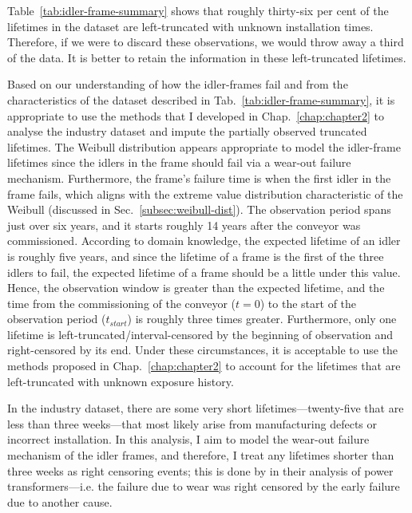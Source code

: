 Table~\ref{tab:idler-frame-summary} shows that roughly thirty-six per cent of the lifetimes in the dataset are left-truncated with unknown installation times. Therefore, if we were to discard these observations, we would throw away a third of the data. It is better to retain the information in these left-truncated lifetimes.

Based on our understanding of how the idler-frames fail and from the characteristics of the dataset described in Tab.~\ref{tab:idler-frame-summary}, it is appropriate to use the methods that I developed in Chap.~\ref{chap:chapter2} to analyse the industry dataset and impute the partially observed truncated lifetimes. The Weibull distribution appears appropriate to model the idler-frame lifetimes since the idlers in the frame should fail via a wear-out failure mechanism. Furthermore, the frame's failure time is when the first idler in the frame fails, which aligns with the extreme value distribution characteristic of the Weibull (discussed in Sec.~\ref{subsec:weibull-dist}). The observation period spans just over six years, and it starts roughly 14 years after the conveyor was commissioned. According to domain knowledge, the expected lifetime of an idler is roughly five years, and since the lifetime of a frame is the first of the three idlers to fail, the expected lifetime of a frame should be a little under this value. Hence, the observation window is greater than the expected lifetime, and the time from the commissioning of the conveyor ($t = 0$) to the start of the observation period ($t_{start}$) is roughly three times greater. Furthermore, only one lifetime is left-truncated/interval-censored by the beginning of observation and right-censored by its end. Under these circumstances, it is acceptable to use the methods proposed in Chap.~\ref{chap:chapter2} to account for the lifetimes that are left-truncated with unknown exposure history.

In the industry dataset, there are some very short lifetimes---twenty-five that are less than three weeks---that most likely arise from manufacturing defects or incorrect installation. In this analysis, I aim to model the wear-out failure mechanism of the idler frames, and therefore, I treat any lifetimes shorter than three weeks as right censoring events; this is done by \citet{hong2009} in their analysis of power transformers---i.e. the failure due to wear was right censored by the early failure due to another cause.

